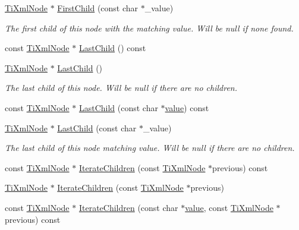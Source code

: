 \begin{DoxyCompactItemize}
\item 
\hyperlink{class_ti_xml_node}{Ti\+Xml\+Node} $\ast$ \hyperlink{class_ti_xml_node_abc8bf32be6419ec453a731868de19554}{First\+Child} (const char $\ast$\+\_\+value)
\begin{DoxyCompactList}\small\item\em The first child of this node with the matching \textquotesingle{}value\textquotesingle{}. Will be null if none found. \end{DoxyCompactList}\item 
const \hyperlink{class_ti_xml_node}{Ti\+Xml\+Node} $\ast$ \hyperlink{class_ti_xml_node_af3a04120b1ed2fead2f4bb72cbea845e}{Last\+Child} () const
\item 
\hyperlink{class_ti_xml_node}{Ti\+Xml\+Node} $\ast$ \hyperlink{class_ti_xml_node_a6432d2b2495f6caf9cb4278df706a031}{Last\+Child} ()
\begin{DoxyCompactList}\small\item\em The last child of this node. Will be null if there are no children. \end{DoxyCompactList}\item 
const \hyperlink{class_ti_xml_node}{Ti\+Xml\+Node} $\ast$ \hyperlink{class_ti_xml_node_afdd7b6ba456fdd570610c1d841f91eb3}{Last\+Child} (const char $\ast$\hyperlink{class_ti_xml_node_aead528b3cedc33c16a6c539872c7cc8b}{value}) const
\item 
\hyperlink{class_ti_xml_node}{Ti\+Xml\+Node} $\ast$ \hyperlink{class_ti_xml_node_abad5bf1059c48127b958711ef89e8e5d}{Last\+Child} (const char $\ast$\+\_\+value)
\begin{DoxyCompactList}\small\item\em The last child of this node matching \textquotesingle{}value\textquotesingle{}. Will be null if there are no children. \end{DoxyCompactList}\item 
const \hyperlink{class_ti_xml_node}{Ti\+Xml\+Node} $\ast$ \hyperlink{class_ti_xml_node_a67c3a02b797f08d9a31b2553661257e1}{Iterate\+Children} (const \hyperlink{class_ti_xml_node}{Ti\+Xml\+Node} $\ast$previous) const
\item 
\hyperlink{class_ti_xml_node}{Ti\+Xml\+Node} $\ast$ \hyperlink{class_ti_xml_node_a2358e747118fdbf0e467b1e4f7d03de1}{Iterate\+Children} (const \hyperlink{class_ti_xml_node}{Ti\+Xml\+Node} $\ast$previous)
\item 
const \hyperlink{class_ti_xml_node}{Ti\+Xml\+Node} $\ast$ \hyperlink{class_ti_xml_node_a74bc68a536c279a42af346cb1454f143}{Iterate\+Children} (const char $\ast$\hyperlink{class_ti_xml_node_aead528b3cedc33c16a6c539872c7cc8b}{value}, const \hyperlink{class_ti_xml_node}{Ti\+Xml\+Node} $\ast$previous) const

\end{DoxyCompactItemize}
